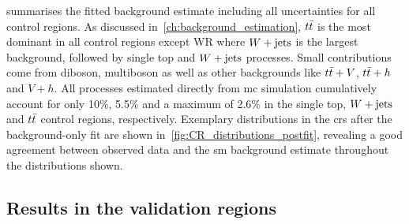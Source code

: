  summarises the fitted background estimate including all uncertainties for all control regions. As discussed in~\cref{ch:background_estimation}, $t\bar{t}$ is the most dominant in all control regions except WR where $W+\mathrm{jets}$ is the largest background, followed by single top and $W+\mathrm{jets}$ processes. Small contributions come from diboson, multiboson as well as other backgrounds like $t\bar{t}+V$, $t\bar{t}+h$ and $V+h$. All processes estimated directly from \gls{mc} simulation cumulatively account for only 10\%, 5.5\% and a maximum of 2.6\% in the single top, $W+\mathrm{jets}$ and $t\bar{t}$ control regions, respectively. Exemplary distributions in the \glspl{cr} after the background-only fit are shown in~\cref{fig:CR_distributions_postfit}, revealing a good agreement between observed data and the \gls{sm} background estimate throughout the distributions shown.

\subsection{Results in the validation regions}
	
